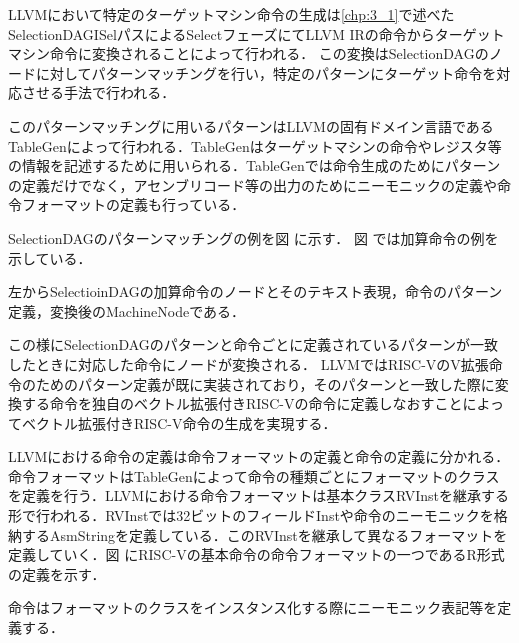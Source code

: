 
LLVMにおいて特定のターゲットマシン命令の生成は\ref{chp:3_1}で述べたSelectionDAGISelパスによるSelectフェーズにてLLVM IRの命令からターゲットマシン命令に変換されることによって行われる．
この変換はSelectionDAGのノードに対してパターンマッチングを行い，特定のパターンにターゲット命令を対応させる手法で行われる．

このパターンマッチングに用いるパターンはLLVMの固有ドメイン言語であるTableGenによって行われる．TableGenはターゲットマシンの命令やレジスタ等の情報を記述するために用いられる．TableGenでは命令生成のためにパターンの定義だけでなく，アセンブリコード等の出力のためにニーモニックの定義や命令フォーマットの定義も行っている．

SelectionDAGのパターンマッチングの例を図%
に示す．
図%
では加算命令の例を示している．

左からSelectioinDAGの加算命令のノードとそのテキスト表現，命令のパターン定義，変換後のMachineNodeである．

この様にSelectionDAGのパターンと命令ごとに定義されているパターンが一致したときに対応した命令にノードが変換される．
LLVMではRISC-VのV拡張命令のためのパターン定義が既に実装されており，そのパターンと一致した際に変換する命令を独自のベクトル拡張付きRISC-Vの命令に定義しなおすことによってベクトル拡張付きRISC-V命令の生成を実現する．

LLVMにおける命令の定義は命令フォーマットの定義と命令の定義に分かれる．命令フォーマットはTableGenによって命令の種類ごとにフォーマットのクラスを定義を行う．LLVMにおける命令フォーマットは基本クラスRVInstを継承する形で行われる．RVInstでは32ビットのフィールドInstや命令のニーモニックを格納するAsmStringを定義している．このRVInstを継承して異なるフォーマットを定義していく．図%
にRISC-Vの基本命令の命令フォーマットの一つであるR形式の定義を示す．


命令はフォーマットのクラスをインスタンス化する際にニーモニック表記等を定義する．
